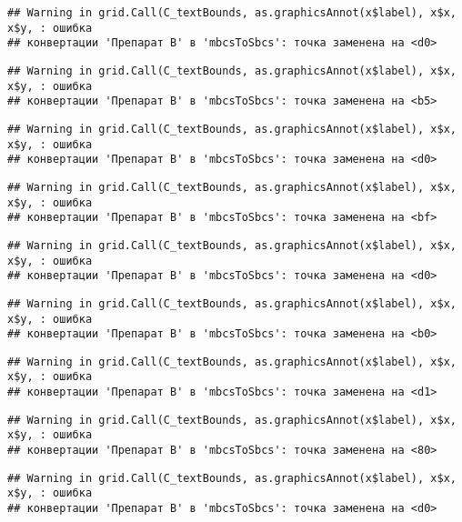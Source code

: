 \documentclass[
]{article}
\begin{document}
\begin{verbatim}
## Warning in grid.Call(C_textBounds, as.graphicsAnnot(x$label), x$x, x$y, : ошибка
## конвертации 'Препарат B' в 'mbcsToSbcs': точка заменена на <d0>
\end{verbatim}

\begin{verbatim}
## Warning in grid.Call(C_textBounds, as.graphicsAnnot(x$label), x$x, x$y, : ошибка
## конвертации 'Препарат B' в 'mbcsToSbcs': точка заменена на <b5>
\end{verbatim}

\begin{verbatim}
## Warning in grid.Call(C_textBounds, as.graphicsAnnot(x$label), x$x, x$y, : ошибка
## конвертации 'Препарат B' в 'mbcsToSbcs': точка заменена на <d0>
\end{verbatim}

\begin{verbatim}
## Warning in grid.Call(C_textBounds, as.graphicsAnnot(x$label), x$x, x$y, : ошибка
## конвертации 'Препарат B' в 'mbcsToSbcs': точка заменена на <bf>
\end{verbatim}

\begin{verbatim}
## Warning in grid.Call(C_textBounds, as.graphicsAnnot(x$label), x$x, x$y, : ошибка
## конвертации 'Препарат B' в 'mbcsToSbcs': точка заменена на <d0>
\end{verbatim}

\begin{verbatim}
## Warning in grid.Call(C_textBounds, as.graphicsAnnot(x$label), x$x, x$y, : ошибка
## конвертации 'Препарат B' в 'mbcsToSbcs': точка заменена на <b0>
\end{verbatim}

\begin{verbatim}
## Warning in grid.Call(C_textBounds, as.graphicsAnnot(x$label), x$x, x$y, : ошибка
## конвертации 'Препарат B' в 'mbcsToSbcs': точка заменена на <d1>
\end{verbatim}

\begin{verbatim}
## Warning in grid.Call(C_textBounds, as.graphicsAnnot(x$label), x$x, x$y, : ошибка
## конвертации 'Препарат B' в 'mbcsToSbcs': точка заменена на <80>
\end{verbatim}

\begin{verbatim}
## Warning in grid.Call(C_textBounds, as.graphicsAnnot(x$label), x$x, x$y, : ошибка
## конвертации 'Препарат B' в 'mbcsToSbcs': точка заменена на <d0>
\end{verbatim}
\end{document}
